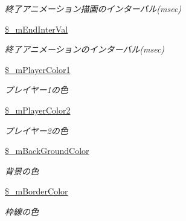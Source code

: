 \begin{DoxyCompactItemize}
\begin{DoxyCompactList}\small\item\em 終了アニメーション描画のインターバル(msec) \end{DoxyCompactList}\item 
\hyperlink{class_reversi_setting_a9a7c91b280df7302a2545e8249f7a98b}{\$\+\_\+m\+End\+Inter\+Val}\hypertarget{class_reversi_setting_a9a7c91b280df7302a2545e8249f7a98b}{}\label{class_reversi_setting_a9a7c91b280df7302a2545e8249f7a98b}

\begin{DoxyCompactList}\small\item\em 終了アニメーションのインターバル(msec) \end{DoxyCompactList}\item 
\hyperlink{class_reversi_setting_a8e0bf25cff29a3743b30c7a6d17a4855}{\$\+\_\+m\+Player\+Color1}\hypertarget{class_reversi_setting_a8e0bf25cff29a3743b30c7a6d17a4855}{}\label{class_reversi_setting_a8e0bf25cff29a3743b30c7a6d17a4855}

\begin{DoxyCompactList}\small\item\em プレイヤー1の色 \end{DoxyCompactList}\item 
\hyperlink{class_reversi_setting_a15cb29ead1e4f1bb90eb82819317ea87}{\$\+\_\+m\+Player\+Color2}\hypertarget{class_reversi_setting_a15cb29ead1e4f1bb90eb82819317ea87}{}\label{class_reversi_setting_a15cb29ead1e4f1bb90eb82819317ea87}

\begin{DoxyCompactList}\small\item\em プレイヤー2の色 \end{DoxyCompactList}\item 
\hyperlink{class_reversi_setting_a69c86bb449573ccc89975e29066e71d7}{\$\+\_\+m\+Back\+Ground\+Color}\hypertarget{class_reversi_setting_a69c86bb449573ccc89975e29066e71d7}{}\label{class_reversi_setting_a69c86bb449573ccc89975e29066e71d7}

\begin{DoxyCompactList}\small\item\em 背景の色 \end{DoxyCompactList}\item 
\hyperlink{class_reversi_setting_a901c34066dafa1810c09bc3037e692f6}{\$\+\_\+m\+Border\+Color}\hypertarget{class_reversi_setting_a901c34066dafa1810c09bc3037e692f6}{}\label{class_reversi_setting_a901c34066dafa1810c09bc3037e692f6}

\begin{DoxyCompactList}\small\item\em 枠線の色 \end{DoxyCompactList}\end{DoxyCompactItemize}


